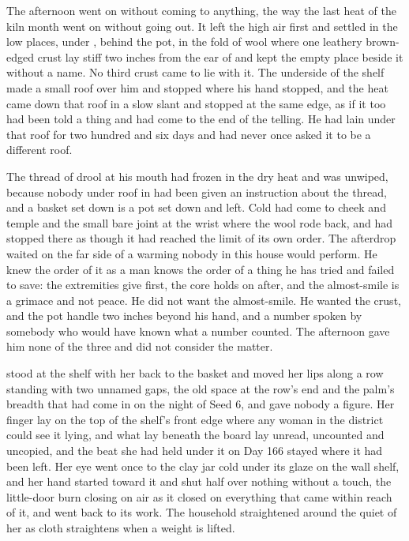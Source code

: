 The afternoon went on without coming to anything, the way the last heat of the kiln month went on without going out. It left the high air first and settled in the low places, under , behind the pot, in the fold of wool where one leathery brown-edged crust lay stiff two inches from the ear of  and kept the empty place beside it without a name. No third crust came to lie with it. The underside of the shelf made a small roof over him and stopped where his hand stopped, and the heat came down that roof in a slow slant and stopped at the same edge, as if it too had been told a thing and had come to the end of the telling. He had lain under that roof for two hundred and six days and had never once asked it to be a different roof.

The thread of drool at his mouth had frozen in the dry heat and was unwiped, because nobody under  roof in  had been given an instruction about the thread, and a basket set down is a pot set down and left. Cold had come to cheek and temple and the small bare joint at the wrist where the wool rode back, and had stopped there as though it had reached the limit of its own order. The afterdrop waited on the far side of a warming nobody in this house would perform. He knew the order of it as a man knows the order of a thing he has tried and failed to save: the extremities give first, the core holds on after, and the almost-smile is a grimace and not peace. He did not want the almost-smile. He wanted the crust, and the pot handle two inches beyond his hand, and a number spoken by somebody who would have known what a number counted. The afternoon gave him none of the three and did not consider the matter.

\scenebreak

 stood at the shelf with her back to the basket and moved her lips along a row standing with two unnamed gaps, the old space at the row's end and the palm's breadth that had come in on the night of Seed 6, and gave nobody a figure. Her finger lay on the top of the shelf's front edge where any woman in the district could see it lying, and what lay beneath the board lay unread, uncounted and uncopied, and the beat she had held under it on Day 166 stayed where it had been left. Her eye went once to the clay jar cold under its glaze on the wall shelf, and her hand started toward it and shut half over nothing without a touch, the little-door burn closing on air as it closed on everything that came within reach of it, and went back to its work. The household straightened around the quiet of her as cloth straightens when a weight is lifted.

